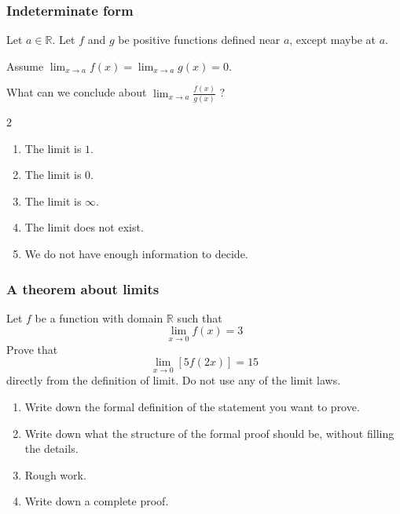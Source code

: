 \documentclass[14pt]{beamer}
\begin{document}
\begin{frame}[t]
	\frametitle{Indeterminate form}

	Let $a \in \mathbb{R}$. Let $f$ and $g$ be positive functions defined near $a$,
	except maybe at $a$.

	\vfill

	Assume $\displaystyle \lim_{x \to a}f(x) = \lim_{x \to a}g(x) = 0$.

	\vfill

	What can we conclude about \quad
	$\displaystyle \lim_{x \to a}\frac{f(x)}{g(x)}$ ?

	\vfill

	\begin{multicols}{2}
		\begin{enumerate}
			\item The limit is $1$.

			\item The limit is $0$.

			\item The limit is $\infty$.

			\item The limit does not exist.

			\item We do not have enough information to decide.
		\end{enumerate}
	\end{multicols}
\end{frame}

\begin{frame}
	\frametitle{A theorem about limits}
	\fontsize{13}{13}\selectfont
	\begin{block}{}
		Let $f$ be a function with domain $\mathbb{R}$ such that
		\[
			\lim_{x\to 0}f(x) = 3
		\]
		Prove that
		\[
			\lim_{x\to 0}\left[ 5 f(2x) \right] =15
		\]
		directly from the definition of limit. Do not use any of the limit laws.
	\end{block}
	\begin{enumerate}

		\item Write down the formal definition of the statement you want to prove.

		\item Write down what the structure of the formal proof should be, without
			filling the details.

		\item Rough work.

		\item Write down a complete proof.
	\end{enumerate}
\end{frame}
\end{document}
